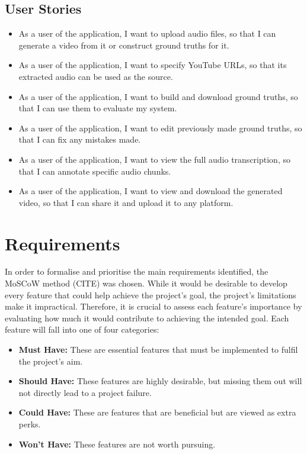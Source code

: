 \documentclass{l4proj}
\begin{document}
\subsection{User Stories}
\begin{itemize}
    \item As a user of the application, I want to upload audio files, so that I can generate a video from it or construct ground truths for it.
    \item As a user of the application, I want to specify YouTube URLs, so that its extracted audio can be used as the source.
    \item As a user of the application, I want to build and download ground truths, so that I can use them to evaluate my system.
    \item As a user of the application, I want to edit previously made ground truths, so that I can fix any mistakes made.
    \item As a user of the application, I want to view the full audio transcription, so that I can annotate specific audio chunks.
    \item As a user of the application, I want to view and download the generated video, so that I can share it and upload it to any platform.
\end{itemize}


\section{Requirements}
In order to formalise and prioritise the main requirements identified, the MoSCoW method (CITE) was chosen. While it would be desirable to develop every feature that could help achieve the project's goal, the project's limitations make it impractical. Therefore, it is crucial to assess each feature's importance by evaluating how much it would contribute to achieving the intended goal. Each feature will fall into one of four categories:

\begin{itemize}
    \item \textbf{Must Have:} These are essential features that must be implemented to fulfil the project's aim.
    \item \textbf{Should Have:} These features are highly desirable, but missing them out will not directly lead to a project failure.
    \item \textbf{Could Have:} These are features that are beneficial but are viewed as extra perks.
    \item \textbf{Won't Have:} These features are not worth pursuing.
\end{itemize}
\end{document}
